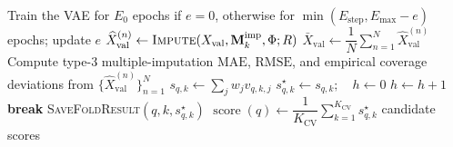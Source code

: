 \begin{algorithm}[ht]
\begin{algorithmic}[1]
        \State Train the VAE for $E_0$ epochs if $e=0$, otherwise for
               $\min(E_{\mathrm{step}},E_{\max}-e)$ epochs; update $e$
          \State $\widehat X_{\mathrm{val}}^{(n)}\gets
                 \textsc{Impute}(X_{\mathrm{val}},
                 \mathbf M_k^{\mathrm{imp}},\Phi;R)$
        \EndFor
        \State $\bar X_{\mathrm{val}}\gets
               \dfrac{1}{N}\sum_{n=1}^{N}\widehat X_{\mathrm{val}}^{(n)}$
        \State Compute type-3 multiple-imputation $\mathrm{MAE}$, $\mathrm{RMSE}$,
               and empirical coverage deviations from
               $\{\widehat X_{\mathrm{val}}^{(n)}\}_{n=1}^N$
        \State $s_{q,k}\gets\sum_j w_j v_{q,k,j}$
          \State $s_{q,k}^{\star}\gets s_{q,k};\quad h\gets0$
        \Else
          \State $h\gets h+1$
        \EndIf
          \State \textbf{break}
        \EndIf
      \EndWhile
      \State \textsc{SaveFoldResult}$(q,k,s_{q,k}^{\star})$
    \EndFor
    \State $\operatorname{score}(q)\gets
           \dfrac{1}{K_{\mathrm{CV}}}
           \sum_{k=1}^{K_{\mathrm{CV}}}s_{q,k}^{\star}$
  \EndFor
  \State \Return candidate scores
\EndProcedure

\end{algorithmic}
\end{algorithm}
